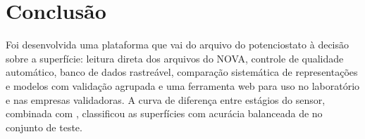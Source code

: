 \section{Conclusão}

Foi desenvolvida uma plataforma que vai do arquivo do potenciostato à decisão sobre a superfície:
leitura direta dos arquivos do NOVA, controle de qualidade automático, banco de dados rastreável,
comparação sistemática de representações e modelos com validação agrupada e uma ferramenta web para
uso no laboratório e nas empresas validadoras. A curva de diferença entre estágios do sensor,
combinada com \MelhorModelo, classificou as superfícies com acurácia balanceada de \ABteste{} no
conjunto de teste. 
